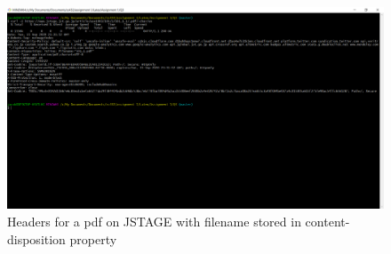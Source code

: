 \documentclass[12pt]{article}
\begin{document}
\begin{figure}[H]
    \centering
    \includegraphics[trim=0 60 10 20, clip, width=\textwidth] {Q3/q3_jstage_curl.PNG}
    \caption{Headers for a pdf on JSTAGE with filename stored in content-disposition property }
    \label{fig:q3JSTAGE_headers}
\end{figure}

\RaggedRight
 
%

\end{document}
